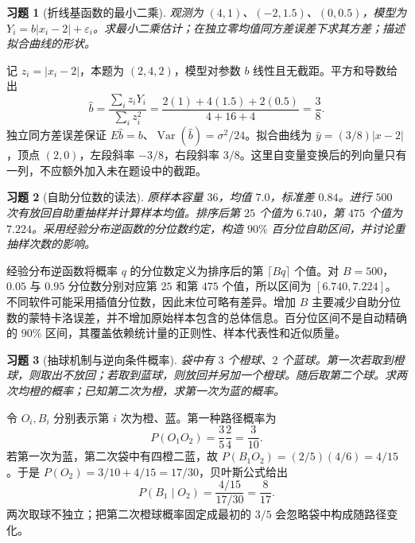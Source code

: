 \documentclass[UTF8,12pt,a4paper,fontset=fandol]{ctexart}
\newtheorem{exercise}{习题}[section]
\begin{document}
\begin{exercise}[折线基函数的最小二乘]\label{q:M-F-12}
观测为 $(4,1)$、$(-2,1.5)$、$(0,0.5)$，模型为 $Y_i=b|x_i-2|+\varepsilon_i$。求最小二乘估计；在独立零均值同方差误差下求其方差；描述拟合曲线的形状。\par{}
\end{exercise}

\begin{solve}\label{a:M-F-12}记 $z_i=|x_i-2|$，本题为 $(2,4,2)$，模型对参数 $b$ 线性且无截距。平方和导数给出\[\widehat b=\frac{\sum_i z_iY_i}{\sum_i z_i^2}=\frac{2(1)+4(1.5)+2(0.5)}{4+16+4}=\frac38.\]独立同方差误差保证 $E\widehat b=b$、$\operatorname{Var}(\widehat b)=\sigma^2/24$。拟合曲线为 $\widehat y=(3/8)|x-2|$，顶点 $(2,0)$，左段斜率 $-3/8$，右段斜率 $3/8$。这里自变量变换后的列向量只有一列，不应额外加入未在题设中的截距。\end{solve}

\begin{exercise}[自助分位数的读法]\label{q:M-F-13}
原样本容量 $36$，均值 $7.0$，标准差 $0.84$。进行 $500$ 次有放回自助重抽样并计算样本均值。排序后第 $25$ 个值为 $6.740$，第 $475$ 个值为 $7.224$。采用经验分布逆函数的分位数约定，构造 $90\%$ 百分位自助区间，并讨论重抽样次数的影响。\par{}
\end{exercise}

\begin{solve}\label{a:M-F-13}经验分布逆函数将概率 $q$ 的分位数定义为排序后的第 $\lceil Bq\rceil$ 个值。对 $B=500$，$0.05$ 与 $0.95$ 分位数分别对应第 $25$ 和第 $475$ 个值，所以区间为 $[6.740,7.224]$。不同软件可能采用插值分位数，因此末位可略有差异。增加 $B$ 主要减少自助分位数的蒙特卡洛误差，并不增加原始样本包含的总体信息。百分位区间不是自动精确的 $90\%$ 区间，其覆盖依赖统计量的正则性、样本代表性和近似质量。\end{solve}

\begin{exercise}[抽球机制与逆向条件概率]\label{q:M-PF-18}
袋中有 $3$ 个橙球、$2$ 个蓝球。第一次若取到橙球，则取出不放回；若取到蓝球，则放回并另加一个橙球。随后取第二个球。求两次均橙的概率；已知第二次为橙，求第一次为蓝的概率。\par{}
\end{exercise}

\begin{solve}\label{a:M-PF-18}令 $O_i,B_i$ 分别表示第 $i$ 次为橙、蓝。第一种路径概率为\[P(O_1O_2)=\frac35\frac24=\frac3{10}.\]若第一次为蓝，第二次袋中有四橙二蓝，故 $P(B_1O_2)=(2/5)(4/6)=4/15$。于是 $P(O_2)=3/10+4/15=17/30$，贝叶斯公式给出\[P(B_1\mid O_2)=\frac{4/15}{17/30}=\frac8{17}.\]两次取球不独立；把第二次橙球概率固定成最初的 $3/5$ 会忽略袋中构成随路径变化。\end{solve}
\end{document}
